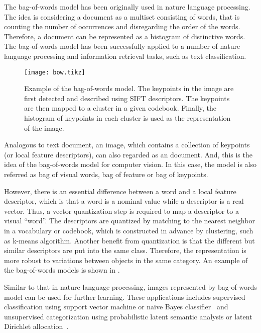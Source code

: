 \documentclass[12pt,final,twoside]{report}
\begin{document}
The bag-of-words model has been originally used in nature language processing. The idea is considering a document as a multiset consisting of words, that is counting the number of occurrences and disregarding the order of the words. Therefore, a document can be represented as a histogram of distinctive words. The bag-of-words model has been successfully applied to a number of nature language processing and information retrieval tasks, such as text classification.

\begin{figure}[t]
  \centering
  \texttt{[image: bow.tikz]}
  \caption[Example of the bag-of-words model.]{Example of the bag-of-words model. The keypoints in the image are first detected and described using SIFT descriptors. The keypoints are then mapped to a cluster in a given codebook. Finally, the histogram of keypoints in each cluster is used as the representation of the image.}
  \label{fig:bow}
\end{figure}

Analogous to text document, an image, which contains a collection of keypoints (or local feature descriptors), can also regarded as an document. And, this is the idea of the bag-of-words model for computer vision. In this case, the model is also referred as bag of visual words, bag of feature or bag of keypoints. 

However, there is an essential difference between a word and a local feature descriptor, which is that a word is a nominal value while a descriptor is a real vector. Thus, a vector quantization step is required to map a descriptor to a visual ``word''. The descriptors are quantized by matching to the nearest neighbor in a vocabulary or codebook, which is constructed in advance by clustering, such as k-means algorithm. Another benefit from quantization is that the different but similar descriptors are put into the same class. Therefore, the representation is more robust to variations between objects in the same category. An example of the bag-of-words models is shown in .

Similar to that in nature language processing, images represented by bag-of-words model can be used for further learning. These applications includes supervised classification using support vector machine or na\"ive Bayes classifier~\cite{csurka_visual_2004} and unsupervised categorization using probabilistic latent semantic analysis or latent Dirichlet allocation~\cite{sivic_discovering_2005}.
\end{document}
